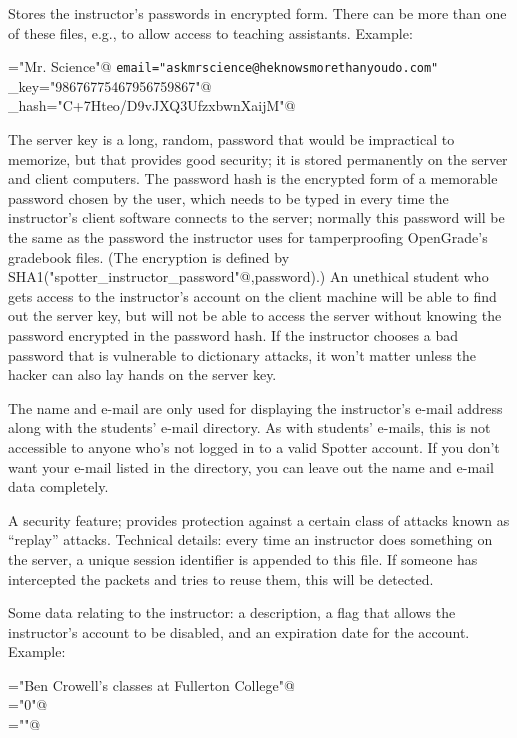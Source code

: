 \documentclass{doc}
\begin{document}
 Stores the instructor's passwords in encrypted form.
There can be more than one of these files, e.g., to allow access to teaching assistants.
Example:

\verb@name="Mr. Science"@
\verb+email="askmrscience@heknowsmorethanyoudo.com"+
\verb@server_key="98676775467956759867"@\\
\verb@password_hash="C+7Hteo/D9vJXQ3UfzxbwnXaijM"@

The server key is a long, random, password that would be impractical to memorize, but that
provides good security; it is stored permanently on the server and client computers.
The password hash is the encrypted form of a memorable password chosen by the user, which
needs to be typed in every time the instructor's client software connects
to the server; normally this password will be the same as the password the instructor uses
for tamperproofing OpenGrade's gradebook files. (The encryption is defined by
SHA1(\verb@"spotter_instructor_password"@,password).)
An unethical student who gets access to the
instructor's account on the client machine will be able to find out the server key, but will not
be able to access the server without knowing the password encrypted in the password hash.
If the instructor chooses a bad password that is vulnerable to dictionary attacks, it won't
matter unless the hacker can also lay hands on the server key.

The name and e-mail are only used for displaying the instructor's e-mail address along with the
students' e-mail directory. As with students' e-mails, this is not accessible to anyone who's
not logged in to a valid Spotter account. If you don't want your e-mail listed in the directory,
you can leave out the name and e-mail data completely.

 A security feature; provides protection against a certain
class of attacks known as ``replay'' attacks. Technical details: every time an instructor does something
on the server, a unique session identifier is appended to this file. If someone
has intercepted the packets and tries to reuse them, this will be detected.

 Some data relating to the instructor: a description, a flag that allows the
instructor's account to be disabled, and an expiration date for the account.
Example:

\verb@description="Ben Crowell's classes at Fullerton College"@\\
\verb@disable="0"@\\
\verb@expire=""@
\end{document}
